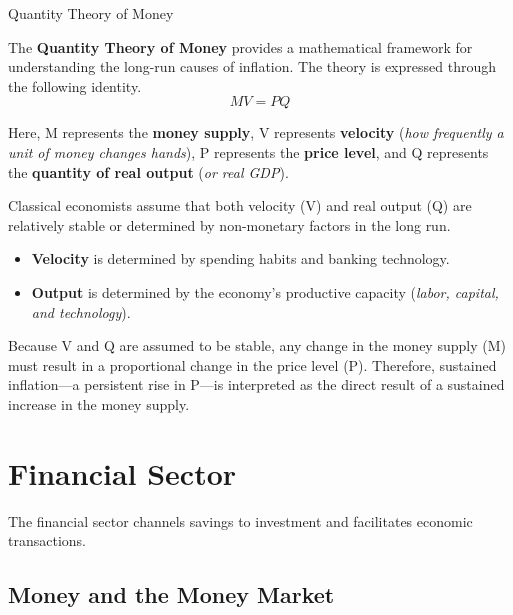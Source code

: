 \documentclass[10pt]{article}
\begin{document}
    \begin{core}{Quantity Theory of Money} %

      The \textbf{Quantity Theory of Money} provides a mathematical framework for understanding the long-run causes of inflation. The theory is expressed through the following identity.
      \[
        MV = PQ
      \]

      Here, M represents the \textbf{money supply}, V represents \textbf{velocity} (\textit{how frequently a unit of money changes hands}), P represents the \textbf{price level}, and Q represents the \textbf{quantity of real output} (\textit{or real GDP}).

      Classical economists assume that both velocity (V) and real output (Q) are relatively stable or determined by non-monetary factors in the long run. 

      \begin{itemize}

        \item \textbf{Velocity} is determined by spending habits and banking technology.

        \item \textbf{Output} is determined by the economy's productive capacity (\textit{labor, capital, and technology}).

      \end{itemize}

      Because V and Q are assumed to be stable, any change in the money supply (M) must result in a proportional change in the price level (P). Therefore, sustained inflation---a persistent rise in P---is interpreted as the direct result of a sustained increase in the money supply.

    \end{core}

\section{Financial Sector}

  The financial sector channels savings to investment and facilitates economic transactions.

  \subsection{Money and the Money Market}
\end{document}

